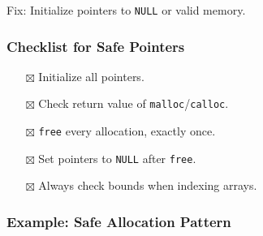 \documentclass[
  letterpaper,
  DIV=11,
  numbers=noendperiod]{scrreprt}
\providecommand{\tightlist}{%
  \setlength{\itemsep}{0pt}\setlength{\parskip}{0pt}}
\begin{document}
Fix: Initialize pointers to \texttt{NULL} or valid memory.

\subsubsection{Checklist for Safe
Pointers}\label{checklist-for-safe-pointers}

\begin{itemize}
\tightlist
\item[$\boxtimes$]
  Initialize all pointers.
\item[$\boxtimes$]
  Check return value of \texttt{malloc}/\texttt{calloc}.
\item[$\boxtimes$]
  \texttt{free} every allocation, exactly once.
\item[$\boxtimes$]
  Set pointers to \texttt{NULL} after \texttt{free}.
\item[$\boxtimes$]
  Always check bounds when indexing arrays.
\end{itemize}

\subsubsection{Example: Safe Allocation
Pattern}\label{example-safe-allocation-pattern}
\end{document}
